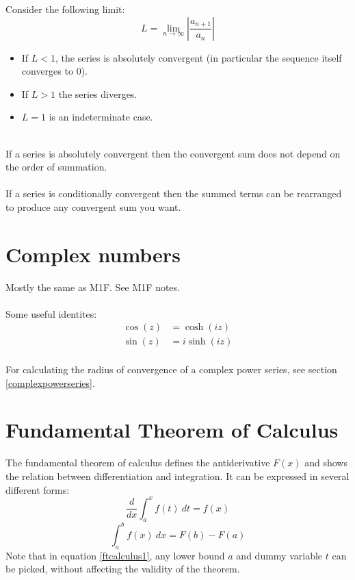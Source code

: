\documentclass{scrartcl}
\begin{document}
Consider the following limit:
\begin{equation}
L = \lim_{n \to \infty} |\frac{a_{n+1}}{a_{n}}|
\end{equation}
\begin{itemize}
\item If $ L < 1 $, the series is absolutely convergent (in particular the sequence itself converges to $ 0 $).
\item If $ L > 1 $ the series diverges.
\item $ L = 1 $ is an indeterminate case.
\end{itemize}
\noindent
\\
If a series is absolutely convergent then the convergent sum does not depend on the order of summation.
\\\\
If a series is conditionally convergent then the summed terms can be rearranged to produce any convergent sum you want.

\section{Complex numbers}
Mostly the same as M1F. See M1F notes.
\\\\
Some useful identites:
\begin{align}
\cos(z) & = \cosh(iz) \\
\sin(z) & = i \sinh(iz)
\end{align}
\\
For calculating the radius of convergence of a complex power series, see section \ref{complexpowerseries}.

\section{Fundamental Theorem of Calculus}
The fundamental theorem of calculus defines the antiderivative $ F(x) $ and shows the relation between differentiation and integration. It can be expressed in several different forms:
\begin{equation} \label{ftcalculus1}
\frac{d}{dx} \int_{a}^{x} f(t) \ dt = f(x)
\end{equation}
\begin{equation}
\int_{a}^{b} f(x) \ dx = F(b) - F(a)
\end{equation}
Note that in equation \ref{ftcalculus1}, any lower bound $ a $ and dummy variable $ t $ can be picked, without affecting the validity of the theorem.
\end{document}

